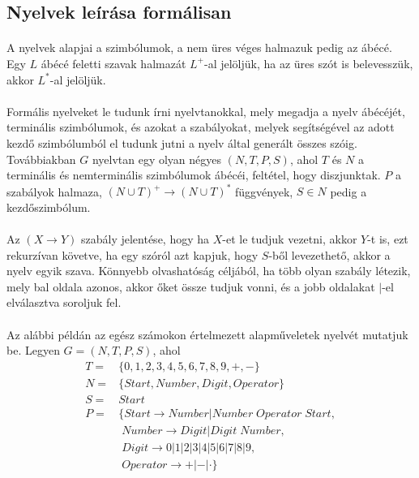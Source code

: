 \documentclass{elteikthesis}
\begin{document}
\subsection{Nyelvek leírása formálisan}
\paragraph{}
A nyelvek alapjai a szimbólumok, a nem üres véges halmazuk pedig az ábécé. Egy $L$ ábécé feletti szavak halmazát $L^+$-al jelöljük, ha az üres szót is belevesszük, akkor $L^*$-al jelöljük.
\paragraph{}
Formális nyelveket le tudunk írni nyelvtanokkal, mely megadja a nyelv ábécéjét, terminális szimbólumok, és azokat a szabályokat, melyek segítségével az adott kezdő szimbólumból el tudunk jutni a nyelv által generált összes szóig. Továbbiakban $G$ nyelvtan egy olyan négyes $(N, T, P, S)$, ahol $T$ és $N$ a terminális és nemterminális szimbólumok ábécéi, feltétel, hogy diszjunktak. $P$ a szabályok halmaza, $(N \cup T)^+ \rightarrow (N \cup T)^*$ függvények, $S \in N$ pedig a kezdőszimbólum.
\paragraph{}
Az $(X \rightarrow Y)$ szabály jelentése, hogy ha $X$-et le tudjuk vezetni, akkor $Y$-t is, ezt rekurzívan követve, ha egy szóról azt kapjuk, hogy $S$-ből levezethető, akkor a nyelv egyik szava. Könnyebb olvashatóság céljából, ha több olyan szabály létezik, mely bal oldala azonos, akkor őket össze tudjuk vonni, és a jobb oldalakat $|$-el elválasztva soroljuk fel.
\paragraph{}
Az alábbi példán az egész számokon értelmezett alapműveletek nyelvét mutatjuk be. Legyen $G=(N, T, P, S)$, ahol
$$
\begin{array}{rl}
T= & \{0, 1, 2, 3, 4, 5, 6, 7, 8, 9, +, -\} \\
N= & \{Start, Number, Digit, Operator\} \\
S= & Start \\
P= & \{Start \rightarrow Number | Number \; Operator \; Start, \\
&\; Number \rightarrow Digit | Digit \; Number, \\
&\; Digit \rightarrow 0 | 1 | 2 | 3 | 4 | 5 | 6 | 7 | 8 | 9, \\
&\; Operator \rightarrow + | -|\cdot\}
\end{array}
$$
\end{document}
